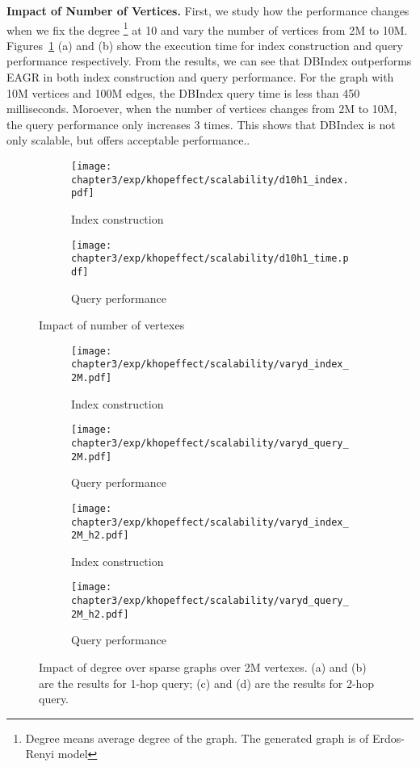 \textbf{Impact of Number of Vertices.} First, we study how the performance 
changes when we fix the degree \footnote{Degree means average degree of the graph. The generated graph is of Erdos-Renyi model } at 10 and vary the number of vertices from 
2M to 10M. Figures~\ref{fig:khop_d10_h1} (a) and (b) show
the execution time for index construction and query performance respectively.
From the results, we can see that DBIndex outperforms EAGR in
both index construction and query performance. For the graph with 
10M vertices and 100M edges, the DBIndex query time is less than 
450 milliseconds. 
Moroever, when the number of vertices changes from 2M to 10M, 
the query performance only increases 3 times. This shows that
DBIndex is not only scalable, but offers acceptable performance..   

\begin{figure}[t]
\centering
\begin{subfigure}{0.48\linewidth}
  \centering
  \texttt{[image: chapter3/exp/khopeffect/scalability/d10h1\_index.pdf]}
  \caption{Index construction}
\end{subfigure}
\begin{subfigure}{0.48\linewidth}
  \centering
  \texttt{[image: chapter3/exp/khopeffect/scalability/d10h1\_time.pdf]}
  \caption{Query performance}
\end{subfigure}%
\caption{Impact of number of vertexes }
\label{fig:khop_d10_h1}
\end{figure}

\begin{figure}[t]
\centering
\begin{subfigure}{0.46\linewidth}
  \centering
  \texttt{[image: chapter3/exp/khopeffect/scalability/varyd\_index\_2M.pdf]}
  \caption{Index construction}
\end{subfigure}
\begin{subfigure}{0.50\linewidth}
  \centering
  \texttt{[image: chapter3/exp/khopeffect/scalability/varyd\_query\_2M.pdf]}
  \caption{Query performance}
\end{subfigure}
\begin{subfigure}{0.50\linewidth}
  \centering
  \texttt{[image: chapter3/exp/khopeffect/scalability/varyd\_index\_2M\_h2.pdf]}
  \caption{Index construction}
\end{subfigure}
\begin{subfigure}{0.46\linewidth}
  \centering
  \texttt{[image: chapter3/exp/khopeffect/scalability/varyd\_query\_2M\_h2.pdf]}
  \caption{Query performance}
\end{subfigure}
\caption{Impact of degree over sparse graphs over 2M vertexes. (a) and (b) are the results for 1-hop query; (c) and (d) are the results for 2-hop query. }
\label{fig:khop_v2m}
\end{figure}

